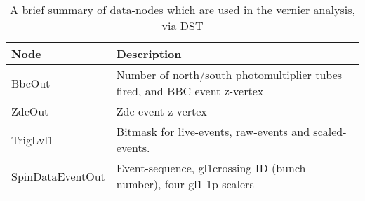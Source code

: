 \begin{table}
\centering
\begin{tabular}{ l p{6cm} }
\toprule
\textbf{Node} & \textbf{Description} \\
\midrule 
BbcOut           & Number of north/south photomultiplier tubes fired, and BBC event z-vertex \\
ZdcOut           & Zdc event z-vertex  \\
TrigLvl1         & Bitmask for live-events, raw-events and scaled-events. \\
SpinDataEventOut & Event-sequence, gl1crossing ID (bunch number), four gl1-1p scalers \\
\bottomrule
\end{tabular}
\caption{ A brief summary of data-nodes which are used in the vernier analysis, via DST }
\label{tab:dstnodes}
\end{table}
